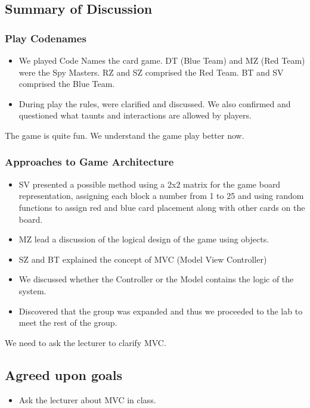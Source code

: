 \documentclass[12pt]{article}
\begin{document}
	\subsection{Summary of Discussion }
		\subsubsection{Play Codenames }
			\begin{itemize}
				\item We played Code Names the card game. DT (Blue Team) and MZ (Red Team) were the Spy Masters. RZ and SZ comprised the Red Team. BT and SV comprised the Blue Team. 
				\item During play the rules, were clarified and discussed. We also confirmed and questioned what taunts and interactions are allowed by players.   
			\end{itemize}
			The game is quite fun. We understand the game play better now. 
	
	\subsubsection{Approaches to Game Architecture  }
	\begin{itemize}
		\item SV presented a possible method using a 2x2 matrix for the game board representation, assigning each block a number from 1 to 25 and using random functions to assign red and blue card placement along with other cards on the board. 
		\item MZ lead a discussion of the logical design of the game using objects.
		\item SZ and BT explained the concept of MVC (Model View Controller)
		\item We discussed whether the Controller or the Model contains the logic of the system.
		\item Discovered that the group was expanded and thus we proceeded to the lab to meet the rest of the group. 
	\end{itemize}
	We need to ask the lecturer to clarify MVC. 
	
	\subsection{Agreed upon goals}
	\begin{itemize}
		\item Ask the lecturer about MVC in class. 
	\end{itemize}
	
\end{document}
